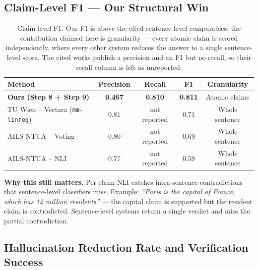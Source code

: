 \subsection{Claim-Level F1 --- Our Structural Win}
\label{sec:claim-f1}

\begin{table}[ht]
\centering
\small
\begin{tabular}{lcccc}
\hline
\textbf{Method} & \textbf{Precision} & \textbf{Recall} & \textbf{F1} & \textbf{Granularity} \\
\hline
\textbf{Ours (Step 8 + Step 9)} & \textbf{0.467} & \textbf{0.810} & \textbf{0.811} & Atomic claims \\
TU Wien -- Vectara (\texttt{mm-linreg}) & 0.81 & not reported & 0.71 & Whole sentence \\
AILS-NTUA -- Voting & 0.80 & not reported & 0.69 & Whole sentence \\
AILS-NTUA -- NLI & 0.77 & not reported & 0.59 & Whole sentence \\
\hline
\end{tabular}
\caption{Claim-level F1. Our F1 is above the cited sentence-level comparables; the contribution claimed here is granularity --- every atomic claim is scored independently, where every other system reduces the answer to a single sentence-level score. The cited works publish a precision and an F1 but no recall, so their recall column is left as unreported.}
\label{tab:claim-f1-2}
\end{table}

\textbf{Why this still matters.} Per-claim NLI catches intra-sentence contradictions that
sentence-level classifiers miss. Example: \textit{``Paris is the capital of
France, which has 12 million residents''} --- the capital claim is
supported but the resident claim is contradicted. Sentence-level systems
return a single verdict and miss the partial contradiction.

\subsection{Hallucination Reduction Rate and Verification Success}
\label{sec:hrr-vsr}

